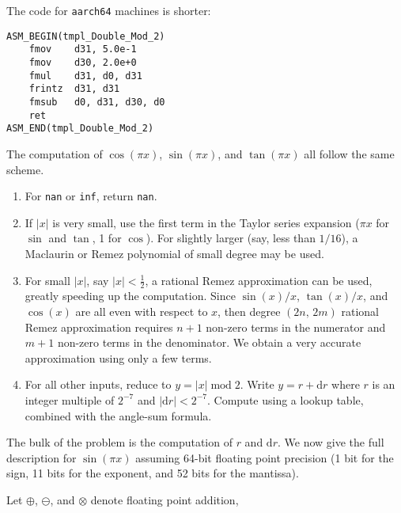 \documentclass{article}
\theoremstyle{plain}
\begin{document}
        \newpage
        The code for \texttt{aarch64} machines is shorter:
        \begin{mdframed}
            \begin{lstlisting}[language={[aarch64]Assembler}]
ASM_BEGIN(tmpl_Double_Mod_2)
    fmov    d31, 5.0e-1
    fmov    d30, 2.0e+0
    fmul    d31, d0, d31
    frintz  d31, d31
    fmsub   d0, d31, d30, d0
    ret
ASM_END(tmpl_Double_Mod_2)
            \end{lstlisting}
        \end{mdframed}
        The computation of $\cos(\pi{x})$, $\sin(\pi{x})$, and $\tan(\pi{x})$
        all follow the same scheme.
        \begin{enumerate}
            \item
                For \texttt{nan} or \texttt{inf}, return \texttt{nan}.
            \item
                If $|x|$ is very small, use the first term in the Taylor
                series expansion ($\pi{x}$ for $\sin$ and $\tan$, 1 for
                $\cos$). For slightly larger (say, less than $1/16$), a
                Maclaurin or Remez polynomial of small degree may be used.
            \item
                For small $|x|$, say $|x|<\frac{1}{2}$, a rational Remez
                approximation can be used, greatly speeding up the computation.
                Since $\sin(x)/x$, $\tan(x)/x$, and $\cos(x)$ are all even
                with respect to $x$, then degree $(2n,\,2m)$ rational Remez
                approximation requires $n+1$ non-zero terms in the numerator
                and $m+1$ non-zero terms in the denominator. We obtain a very
                accurate approximation using only a few terms.
            \item
                For all other inputs, reduce to $y=|x|\;\textrm{mod}\;2$.
                Write $y=r+\textrm{d}r$ where $r$ is an integer multiple of
                $2^{-7}$ and $|\textrm{d}r|<2^{-7}$. Compute using a lookup
                table, combined with the angle-sum formula.
        \end{enumerate}
        The bulk of the problem is the computation of $r$ and $\textrm{d}r$.
        We now give the full description for $\sin(\pi{x})$ assuming 64-bit
        floating point precision (1 bit for the sign, 11 bits for the exponent,
        and 52 bits for the mantissa).
        \par\hfill\par
        Let $\oplus$, $\ominus$, and $\otimes$ denote floating point addition,
\end{document}
